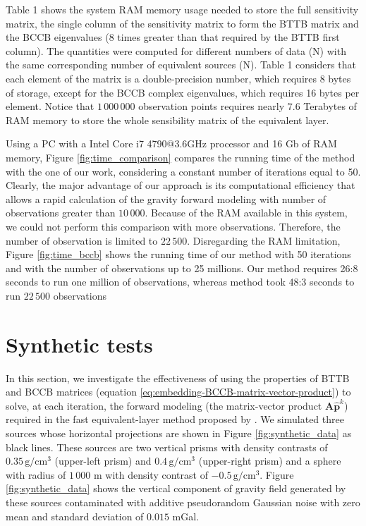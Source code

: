 \documentclass[manuscript,revised]{geophysics}
\begin{document}
Table 1 shows the system RAM memory usage needed to store the full sensitivity matrix, the single column of the sensitivity matrix to form the BTTB matrix and the BCCB eigenvalues ($8$ times greater than that required by the BTTB first column). The quantities were computed for different numbers of data (N) with the same corresponding number of equivalent sources (N). Table 1 considers that each element of the matrix is a double-precision number, which requires 8 bytes of storage, except for the BCCB complex eigenvalues, which requires 16 bytes per element. Notice that $1\,000\,000$ observation points requires nearly $7.6$ Terabytes of RAM memory to store the whole sensibility matrix of the equivalent layer.

Using a PC with a Intel Core i7 4790@3.6GHz processor and 16 Gb of RAM memory, Figure \ref{fig:time_comparison}  compares the running time  of the  \citet{siqueira-etal2017} method with the one of our work, considering a constant number of iterations equal to 50. Clearly, the major advantage of our approach is its computational efficiency that allows a rapid calculation of the gravity forward modeling  with number of observations greater than $10\,000$. Because of the RAM available in this system, we could not perform this comparison with more observations. Therefore, the number of observation is limited to $22\,500$. Disregarding the RAM limitation, Figure \ref{fig:time_bccb} shows the running time of our method with 50 iterations and with the number of observations up to  25 millions. Our method requires 26:8 seconds to run one million of observations, whereas \citet{siqueira-etal2017} method took 48:3 seconds to run $22\,500$ observations


\section{Synthetic tests}
In this section, we  investigate the effectiveness of using the properties of BTTB and BCCB matrices (equation \ref{eq:embedding-BCCB-matrix-vector-product})  to solve, at each iteration, the forward modeling (the matrix-vector product $\mathbf{A} \hat{\mathbf{p}}^k$)  required in the fast equivalent-layer method proposed by \citet{siqueira-etal2017}.  We simulated three sources whose horizontal projections are shown in Figure \ref{fig:synthetic_data} as black lines.  These sources are two vertical prisms with density contrasts of $0.35\, \mathrm{g/cm^3}$ (upper-left prism) and $0.4\, \mathrm{g/cm^3}$ (upper-right prism) and a sphere with radius of $1\,000$ m with density contrast of $-0.5\, \mathrm{g/cm^3}$. Figure \ref{fig:synthetic_data}  shows the vertical component of gravity field generated by these sources contaminated with additive pseudorandom Gaussian noise with zero mean and standard deviation of $0.015$ mGal.
 
\end{document}
